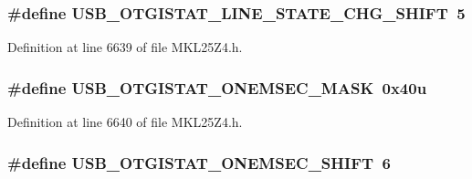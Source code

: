 \subsubsection[{\texorpdfstring{U\+S\+B\+\_\+\+O\+T\+G\+I\+S\+T\+A\+T\+\_\+\+L\+I\+N\+E\+\_\+\+S\+T\+A\+T\+E\+\_\+\+C\+H\+G\+\_\+\+S\+H\+I\+FT}{USB_OTGISTAT_LINE_STATE_CHG_SHIFT}}]{\setlength{\rightskip}{0pt plus 5cm}\#define U\+S\+B\+\_\+\+O\+T\+G\+I\+S\+T\+A\+T\+\_\+\+L\+I\+N\+E\+\_\+\+S\+T\+A\+T\+E\+\_\+\+C\+H\+G\+\_\+\+S\+H\+I\+FT~5}\hypertarget{group___u_s_b___register___masks_ga7cb2076a9bf32a49fdbc7efcfc5fb8bb}{}\label{group___u_s_b___register___masks_ga7cb2076a9bf32a49fdbc7efcfc5fb8bb}


Definition at line 6639 of file M\+K\+L25\+Z4.\+h.

\subsubsection[{\texorpdfstring{U\+S\+B\+\_\+\+O\+T\+G\+I\+S\+T\+A\+T\+\_\+\+O\+N\+E\+M\+S\+E\+C\+\_\+\+M\+A\+SK}{USB_OTGISTAT_ONEMSEC_MASK}}]{\setlength{\rightskip}{0pt plus 5cm}\#define U\+S\+B\+\_\+\+O\+T\+G\+I\+S\+T\+A\+T\+\_\+\+O\+N\+E\+M\+S\+E\+C\+\_\+\+M\+A\+SK~0x40u}\hypertarget{group___u_s_b___register___masks_gaa59b13f2f60173eaf2844dd089a6b31a}{}\label{group___u_s_b___register___masks_gaa59b13f2f60173eaf2844dd089a6b31a}


Definition at line 6640 of file M\+K\+L25\+Z4.\+h.

\subsubsection[{\texorpdfstring{U\+S\+B\+\_\+\+O\+T\+G\+I\+S\+T\+A\+T\+\_\+\+O\+N\+E\+M\+S\+E\+C\+\_\+\+S\+H\+I\+FT}{USB_OTGISTAT_ONEMSEC_SHIFT}}]{\setlength{\rightskip}{0pt plus 5cm}\#define U\+S\+B\+\_\+\+O\+T\+G\+I\+S\+T\+A\+T\+\_\+\+O\+N\+E\+M\+S\+E\+C\+\_\+\+S\+H\+I\+FT~6}\hypertarget{group___u_s_b___register___masks_ga561173eac45ee89d7447416da7747ec2}{}\label{group___u_s_b___register___masks_ga561173eac45ee89d7447416da7747ec2}


